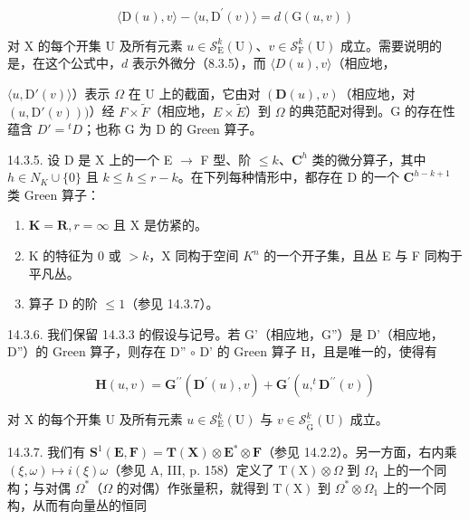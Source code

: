\[
\langle \mathrm{D} (u), v \rangle - \langle u, \mathrm{D} ^ {\prime} (v) \rangle = d (\mathrm{G} (u, v))\tag{1}
\]

对 X 的每个开集 U 及所有元素 \(u \in \mathcal{S}_{\mathrm{E}}^{k}(\mathrm{U})\)、\(v \in \mathcal{S}_{\mathrm{F}}^{k}(\mathrm{U})\) 成立。需要说明的是，在这个公式中，\(d\) 表示外微分（8.3.5），而 \(\langle D(u), v \rangle\)（相应地，

\(\langle u, \mathrm{D}'(v) \rangle\)）表示 \(\Omega\) 在 U 上的截面，它由对 \((\mathbf{D}(u), v)\)（相应地，对 \((u, \mathrm{D}'(v)))\)）经 \(F \times \tilde{F}\)（相应地，\(E \times \tilde{E}\)）到 \(\Omega\) 的典范配对得到。G 的存在性蕴含 \(D' = {}^t D\)；也称 G 为 D 的 Green 算子。

14.3.5. 设 D 是 X 上的一个 E \(\to\) F 型、阶 \(\leqslant k\)、\(\mathbf{C}^{h}\) 类的微分算子，其中 \(h \in N_{K} \cup \{0\}\) 且 \(k \leqslant h \leqslant r-k\)。在下列每种情形中，都存在 D 的一个 \(\mathbf{C}^{h-k+1}\) 类 Green 算子：

\begin{enumerate}
\def\labelenumi{\alph{enumi})}
\item
  \(\mathbf{K} = \mathbf{R}, r = \infty\) 且 X 是仿紧的。
\item
  K 的特征为 0 或 \(>k\)，X 同构于空间 \(K^{n}\) 的一个开子集，且丛 E 与 F 同构于平凡丛。
\item
  算子 D 的阶 \(\leqslant1\)（参见 14.3.7）。
\end{enumerate}

14.3.6. 我们保留 14.3.3 的假设与记号。若 G'（相应地，G''）是 D'（相应地，D''）的 Green 算子，则存在 D'' \(\circ\) D' 的 Green 算子 H，且是唯一的，使得有

\[
\mathbf {H} (u, v) = \mathbf {G} ^ {\prime \prime} (\mathbf {D} ^ {\prime} (u), v) + \mathbf {G} ^ {\prime} (u, ^ {t} \mathbf {D} ^ {\prime \prime} (v))
\]

对 X 的每个开集 U 及所有元素 \(u \in \mathcal{S}_{\mathrm{E}}^{k}(\mathrm{U})\) 与 \(v \in \mathcal{S}_{\widetilde{\mathrm{G}}}^{k}(\mathrm{U})\) 成立。

14.3.7. 我们有 \(\mathbf{S}^1 (\mathbf{E},\mathbf{F}) = \mathbf{T}(\mathbf{X})\otimes \mathbf{E}^*\otimes \mathbf{F}\)（参见 14.2.2）。另一方面，右内乘 \((\xi ,\omega)\mapsto i(\xi)\omega\)（参见 A, III, p. 158）定义了 \(\mathrm{T(X)}\otimes \Omega\) 到 \(\Omega_{1}\) 上的一个同构；与对偶 \(\Omega^{*}\)（\(\Omega\) 的对偶）作张量积，就得到 \(\mathrm{T(X)}\) 到 \(\Omega^{*}\otimes \Omega_{1}\) 上的一个同构，从而有向量丛的恒同

